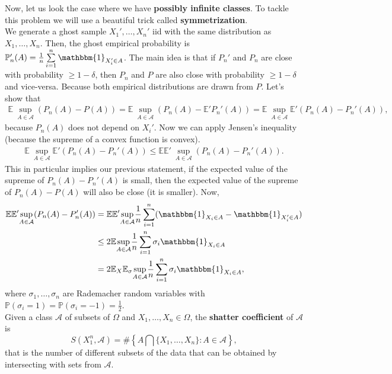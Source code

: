 \documentclass[11pt, english]{article}
\begin{document}
Now, let us look the case where we have \textbf{possibly infinite classes}. To tackle this problem we will use a beautiful trick called \textbf{symmetrization}.\\
We generate a ghost sample $X_1',\dots,X_n'$ iid with the same distribution as $X_1,\dots,X_n$. Then, the ghost empirical probability is $\mathbb{P}_n'(A)=\frac{1}{n}\sum\limits_{i=1}^n\mathbbm{1}_{X_i'\in A}$. The main idea is that if $P_n'$ and $P_n$ are close with probability $\geq 1-\delta$, then $P_n$ and $P$ are also close with probability $\geq 1-\delta$ and vice-versa. Because both empirical distributions are drawn from $P$. Let's show that
\begin{align}
	\mathbb{E}\ \underset{A\in\mathcal{A}}{\sup}(P_n(A)-P(A))=\mathbb{E}\ \underset{A\in\mathcal{A}}{\sup}(P_n(A)-\mathbb{E}'P_n'(A))=\mathbb{E}\ \underset{A\in\mathcal{A}}{\sup}\mathbb{E}'(P_n(A)-P_n'(A)), 
\end{align}
because $P_n(A)$ does not depend on $X_i'$. Now we can apply Jensen's inequality (because the supreme of a convex function is convex).
\begin{align}
	\mathbb{E}\ \underset{A\in\mathcal{A}}{\sup}\mathbb{E}'(P_n(A)-P_n'(A))\leq \mathbb{E}\mathbb{E}'\ \underset{A\in\mathcal{A}}{\sup}(P_n(A)-P_n'(A)). 
\end{align}
 This in particular implies our previous statement, if the expected value of the supreme of $P_n(A)-P_n'(A)$ is small, then the expected value of the supreme of $P_n(A)-P(A)$ will also be close (it is smaller). Now,
 \begin{align}
 	\mathbb{E}\mathbb{E}'\underset{A\in\mathcal{A}}{\sup}(P_n(A)-P_n'(A))&=\mathbb{E}\mathbb{E}'\underset{A\in\mathcal{A}}{\sup}\frac{1}{n}\sum\limits_{i=1}^n(\mathbbm{1}_{X_i\in A}-\mathbbm{1}_{X_i'\in A})\\ 
 	&\leq 2\mathbb{E}\underset{A\in\mathcal{A}}{\sup}\frac{1}{n}\sum\limits_{i=1}^n\sigma_i\mathbbm{1}_{X_i\in A}\\
 	&=2\mathbb{E}_X\mathbb{E}_{\sigma}\underset{A\in\mathcal{A}}{\sup}\frac{1}{n}\sum\limits_{i=1}^n\sigma_i\mathbbm{1}_{X_i\in A},
 \end{align}
 where $\sigma_1,\dots,\sigma_n$ are Rademacher random variables with $\mathbb{P}(\sigma_i=1)=\mathbb{P}(\sigma_i=-1)=\frac{1}{2}$.\\
 
 Given a class $\mathcal{A}$ of subsets of $\Omega$ and $X_1,\dots,X_n\in \Omega$, the \textbf{shatter coefficient} of $\mathcal{A}$ is 
 \begin{equation}
 	S(X_1^n,\mathcal{A})=\#\left\{A\bigcap\{X_1,\dots,X_n\}:A\in\mathcal{A}\right\},
 \end{equation}
 that is the number of different subsets of the data that can be obtained by intersecting with sets from $\mathcal{A}$.\\
 
\end{document}

